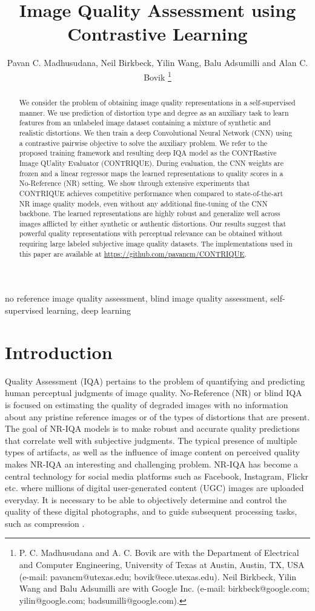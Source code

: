 \documentclass[journal]{IEEEtran}
\title{Image Quality Assessment using Contrastive Learning}
\author{Pavan C. Madhusudana, Neil Birkbeck, Yilin Wang,  Balu Adsumilli and Alan C. Bovik 
	\thanks{P. C. Madhusudana and A. C. Bovik are with the Department of Electrical and
Computer Engineering, University of Texas at Austin, Austin, TX, USA (e-mail:
pavancm@utexas.edu; bovik@ece.utexas.edu). Neil Birkbeck, Yilin Wang
and Balu Adsumilli are with Google Inc. (e-mail: birkbeck@google.com; yilin@google.com; badsumilli@google.com).}}
\begin{document}
\maketitle

\begin{abstract}
We consider the problem of obtaining image quality representations in a self-supervised manner. We use prediction of distortion type and degree as an auxiliary task to learn features from an unlabeled image dataset containing a mixture of synthetic and realistic distortions. We then train a deep Convolutional Neural Network (CNN) using a contrastive pairwise objective to solve the auxiliary problem. We refer to the proposed training framework and resulting deep IQA model as the CONTRastive Image QUality Evaluator (CONTRIQUE). During evaluation, the CNN weights are frozen and a linear regressor maps the learned representations to quality scores in a No-Reference (NR) setting. We show through extensive experiments that CONTRIQUE achieves competitive performance when compared to state-of-the-art NR image quality models, even without any additional fine-tuning of the CNN backbone. The learned representations are highly robust and generalize well across images afflicted by either synthetic or authentic distortions. Our results suggest that powerful quality representations with perceptual relevance can be obtained without requiring large labeled subjective image quality datasets. The implementations used in this paper are available at \url{https://github.com/pavancm/CONTRIQUE}.
\end{abstract}

\begin{IEEEkeywords}
no reference image quality assessment, blind image quality assessment, self-supervised learning, deep learning
\end{IEEEkeywords}

\section{Introduction}
 Quality Assessment (IQA) pertains to the problem of quantifying and predicting human perceptual judgments of image quality. No-Reference (NR) or blind IQA is focused on estimating the quality of degraded images with no information about any pristine reference images or of the types of distortions that are present. The goal of NR-IQA models is to make robust and accurate quality predictions that correlate well with subjective judgments. The typical presence of multiple types of artifacts, as well as the influence of image content on perceived quality makes NR-IQA an interesting and challenging problem. NR-IQA has become a central technology for social media platforms such as Facebook, Instagram, Flickr etc. where millions of digital user-generated content (UGC) images are uploaded everyday. It is necessary to be able to objectively determine and control the quality of these digital photographs, and to guide subsequent processing tasks, such as compression \cite{yu2019predicting}.
\end{document}
